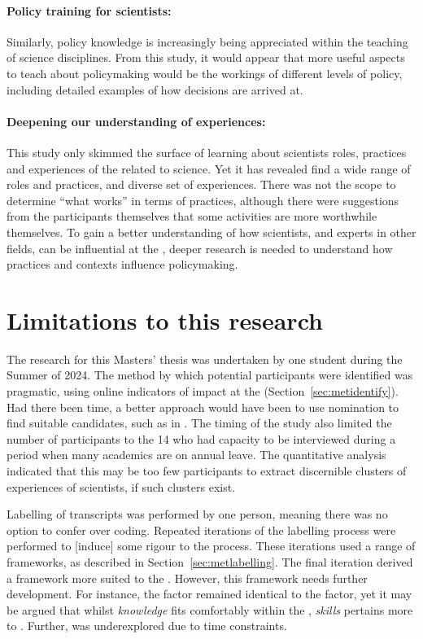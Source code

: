 \paragraph{Policy training for scientists:}
Similarly, policy knowledge is increasingly being appreciated within the teaching of science disciplines. From this study, it would appear that more useful aspects to teach about policymaking would be the workings of different levels of policy, including detailed examples of how decisions are arrived at. 

\paragraph{Deepening our understanding of experiences:}
This study only skimmed the surface of learning about scientists roles, practices and experiences of the \SPI{} related to \CAN{} science. Yet it has revealed find a wide range of roles and practices, and diverse set of experiences. There was not the scope to determine ``what works'' in terms of practices, although there were suggestions from the participants themselves that some activities are more worthwhile themselves. To gain a better understanding of how scientists, and experts in other fields, can be influential at the \SPI, deeper research is needed to understand how practices and contexts influence policymaking.

\section{Limitations to this research}
The research for this Masters' thesis was undertaken by one student during the Summer of 2024. The method by which potential participants were identified was pragmatic, using online indicators of impact at the \SPI{} (Section~\ref{sec:metidentify}). Had there been time, a better approach would have been to use nomination to find suitable candidates, such as in \textcite{HaynesDCRHGS2011}. The timing of the study also limited the number of participants to the 14 who had capacity to be interviewed during a period when many academics are on annual leave. The quantitative analysis indicated that this may be too few participants to extract discernible clusters of experiences of scientists, if such clusters exist.

Labelling of transcripts was performed by one person, meaning there was no option to confer over coding. Repeated iterations of the labelling process were performed to [induce] some rigour to the process. These iterations used a range of frameworks, as described in Section~\ref{sec:metlabelling}. The final iteration derived a framework more suited to the \SPI. However, this framework needs further development. For instance, the \skiskil{} factor remained identical to the \ISM{} \ismis{} factor, yet it may be argued that whilst \emph{knowledge} fits comfortably within the \skiknow{}, \emph{skills} pertains more to \skiscip. Further, \skiemot{} was underexplored due to time constraints.

